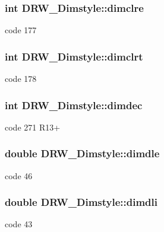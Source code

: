 \subsubsection[{dimclre}]{\setlength{\rightskip}{0pt plus 5cm}int D\+R\+W\+\_\+\+Dimstyle\+::dimclre}\label{class_d_r_w___dimstyle_ad603cb462dc00136ff50933979b0aab7}
code 177 \hypertarget{class_d_r_w___dimstyle_ae89e4a003314815b40b00c26b0cb0ba0}{}
\subsubsection[{dimclrt}]{\setlength{\rightskip}{0pt plus 5cm}int D\+R\+W\+\_\+\+Dimstyle\+::dimclrt}\label{class_d_r_w___dimstyle_ae89e4a003314815b40b00c26b0cb0ba0}
code 178 \hypertarget{class_d_r_w___dimstyle_af71e0007f9eaddb929e7c405fdb365bb}{}
\subsubsection[{dimdec}]{\setlength{\rightskip}{0pt plus 5cm}int D\+R\+W\+\_\+\+Dimstyle\+::dimdec}\label{class_d_r_w___dimstyle_af71e0007f9eaddb929e7c405fdb365bb}
code 271 R13+ \hypertarget{class_d_r_w___dimstyle_a7aebc776b75660bc9947a90416bf8ab4}{}
\subsubsection[{dimdle}]{\setlength{\rightskip}{0pt plus 5cm}double D\+R\+W\+\_\+\+Dimstyle\+::dimdle}\label{class_d_r_w___dimstyle_a7aebc776b75660bc9947a90416bf8ab4}
code 46 \hypertarget{class_d_r_w___dimstyle_a6d13f43f1689621623c4193501ddb5cc}{}
\subsubsection[{dimdli}]{\setlength{\rightskip}{0pt plus 5cm}double D\+R\+W\+\_\+\+Dimstyle\+::dimdli}\label{class_d_r_w___dimstyle_a6d13f43f1689621623c4193501ddb5cc}
code 43 \hypertarget{class_d_r_w___dimstyle_a55bca8cbe1928c4f9cbde1c07041c121}{}
